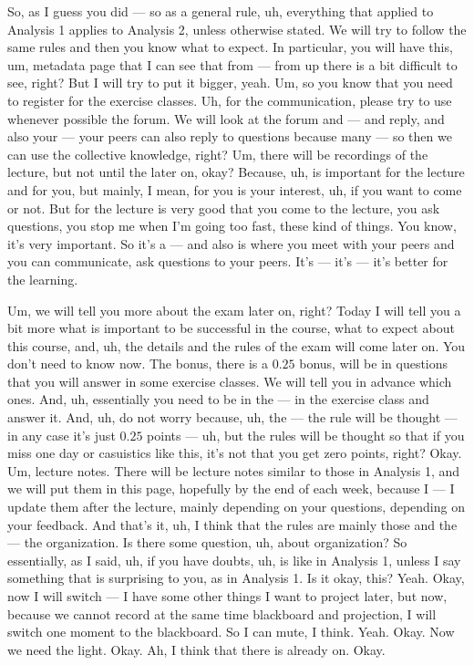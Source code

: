\begin{spoken-clean}[00:01:20 - 00:03:30]
So, as I guess you did — so as a general rule, uh, everything that applied to Analysis 1 applies to Analysis 2, unless otherwise stated. We will try to follow the same rules and then you know what to expect. In particular, you will have this, um, metadata page that I can see that from — from up there is a bit difficult to see, right? But I will try to put it bigger, yeah. Um, so you know that you need to register for the exercise classes. Uh, for the communication, please try to use whenever possible the forum. We will look at the forum and — and reply, and also your — your peers can also reply to questions because many — so then we can use the collective knowledge, right? Um, there will be recordings of the lecture, but not until the later on, okay? Because, uh, is important for the lecture and for you, but mainly, I mean, for you is your interest, uh, if you want to come or not. But for the lecture is very good that you come to the lecture, you ask questions, you stop me when I'm going too fast, these kind of things. You know, it's very important. So it's a — and also is where you meet with your peers and you can communicate, ask questions to your peers. It's — it's — it's better for the learning.
\end{spoken-clean}

\begin{spoken-clean}[00:03:30 - 00:05:07]
Um, we will tell you more about the exam later on, right? Today I will tell you a bit more what is important to be successful in the course, what to expect about this course, and, uh, the details and the rules of the exam will come later on. You don't need to know now. The bonus, there is a $0.25$ bonus, will be in questions that you will answer in some exercise classes. We will tell you in advance which ones. And, uh, essentially you need to be in the — in the exercise class and answer it. And, uh, do not worry because, uh, the — the rule will be thought — in any case it's just $0.25$ points — uh, but the rules will be thought so that if you miss one day or casuistics like this, it's not that you get zero points, right? Okay. Um, lecture notes. There will be lecture notes similar to those in Analysis 1, and we will put them in this page, hopefully by the end of each week, because I — I update them after the lecture, mainly depending on your questions, depending on your feedback. And that's it, uh, I think that the rules are mainly those and the — the organization. Is there some question, uh, about organization? So essentially, as I said, uh, if you have doubts, uh, is like in Analysis 1, unless I say something that is surprising to you, as in Analysis 1. Is it okay, this? Yeah. Okay, now I will switch — I have some other things I want to project later, but now, because we cannot record at the same time blackboard and projection, I will switch one moment to the blackboard.  So I can mute, I think. Yeah. Okay. Now we need the light.  Okay. Ah, I think that there is already on. Okay.
\end{spoken-clean}

